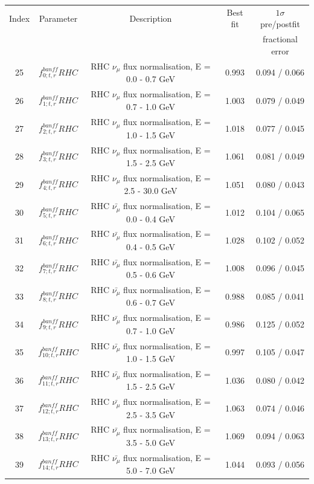 \begin{tabular} { | c | c | c | c | c |  }
\hline 
Index & Parameter & Description & Best fit & $1\sigma$ pre/postfit\\ 
 & &  &  & fractional error\\
\hline 
25 & $f_{0; t, r}^{banff} RHC$ & RHC $\nu_\mu$ flux normalisation, E = 0.0 - 0.7 GeV & 0.993 & 0.094 / 0.066\\ 
26 & $f_{1; t, r}^{banff} RHC$ & RHC $\nu_\mu$ flux normalisation, E = 0.7 - 1.0 GeV & 1.003 & 0.079 / 0.049\\ 
27 & $f_{2; t, r}^{banff} RHC$ & RHC $\nu_\mu$ flux normalisation, E = 1.0 - 1.5 GeV & 1.018 & 0.077 / 0.045\\ 
28 & $f_{3; t, r}^{banff} RHC$ & RHC $\nu_\mu$ flux normalisation, E = 1.5 - 2.5 GeV & 1.061 & 0.081 / 0.049\\ 
29 & $f_{4; t, r}^{banff} RHC$ & RHC $\nu_\mu$ flux normalisation, E = 2.5 - 30.0 GeV & 1.051 & 0.080 / 0.043\\ 
30 & $f_{5; t, r}^{banff} RHC$ & RHC $\bar{\nu_\mu}$ flux normalisation, E = 0.0 - 0.4 GeV & 1.012 & 0.104 / 0.065\\ 
31 & $f_{6; t, r}^{banff} RHC$ & RHC $\bar{\nu_\mu}$ flux normalisation, E = 0.4 - 0.5 GeV & 1.028 & 0.102 / 0.052\\ 
32 & $f_{7; t, r}^{banff} RHC$ & RHC $\bar{\nu_\mu}$ flux normalisation, E = 0.5 - 0.6 GeV & 1.008 & 0.096 / 0.045\\ 
33 & $f_{8; t, r}^{banff} RHC$ & RHC $\bar{\nu_\mu}$ flux normalisation, E = 0.6 - 0.7 GeV & 0.988 & 0.085 / 0.041\\ 
34 & $f_{9; t, r}^{banff} RHC$ & RHC $\bar{\nu_\mu}$ flux normalisation, E = 0.7 - 1.0 GeV & 0.986 & 0.125 / 0.052\\ 
35 & $f_{10; t, r}^{banff} RHC$ & RHC $\bar{\nu_\mu}$ flux normalisation, E = 1.0 - 1.5 GeV & 0.997 & 0.105 / 0.047\\ 
36 & $f_{11; t, r}^{banff} RHC$ & RHC $\bar{\nu_\mu}$ flux normalisation, E = 1.5 - 2.5 GeV & 1.036 & 0.080 / 0.042\\ 
37 & $f_{12; t, r}^{banff} RHC$ & RHC $\bar{\nu_\mu}$ flux normalisation, E = 2.5 - 3.5 GeV & 1.063 & 0.074 / 0.046\\ 
38 & $f_{13; t, r}^{banff} RHC$ & RHC $\bar{\nu_\mu}$ flux normalisation, E = 3.5 - 5.0 GeV & 1.069 & 0.094 / 0.063\\ 
39 & $f_{14; t, r}^{banff} RHC$ & RHC $\bar{\nu_\mu}$ flux normalisation, E = 5.0 - 7.0 GeV & 1.044 & 0.093 / 0.056\\ 

\end{tabular}
